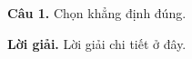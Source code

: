 \documentclass[12pt]{article}
\begin{document}
\textbf{Câu 1.} 
Chọn khẳng định đúng.


\textbf{Lời giải.} Lời giải chi tiết ở đây.
\end{document}
